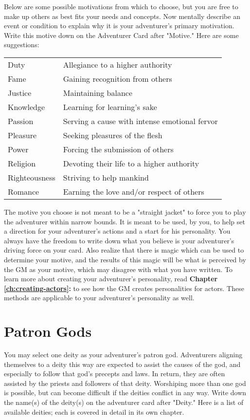 \begin{multicols*}{2}
Below are some possible motivations from which to choose, but you are free to make up others as best fits your needs and concepts. Now mentally describe an event or condition to explain why it is your adventurer's primary motivation. Write this motive down on the Adventurer Card after "Motive." Here are some suggestions:
\begin{normbox}[Motivation]
\begin{tabularx}{\linewidth}{@{} l L}
\small
Duty & Allegiance to a higher authority\\
Fame & Gaining recognition from others\\
Justice & Maintaining balance\\
Knowledge & Learning for learning's sake\\
Passion & Serving a cause with intense emotional fervor\\
Pleasure & Seeking pleasures of the flesh\\
Power & Forcing the submission of others\\
Religion & Devoting their life to a higher authority\\
Righteousness & Striving to help mankind\\
Romance & Earning the love and/or respect of others
\end{tabularx}
\end{normbox}
\normalsize
The motive you choose is not meant to be a "straight jacket" to force you to play the adventurer within narrow bounds. It is meant to be used, by you, to help set a direction for your adventurer's actions and a start for his personality. You always have the freedom to write down what you believe is your adventurer's driving force on your card. Also realize that there is magic which can be used to determine your motive, and the results of this magic will be what is perceived by the GM as your motive, which may disagree with what you have written.
To learn more about creating your adventurer's personality, read \textbf{Chapter \ref{ch:creating-actors}: } to see how the GM creates personalities for actors. These methods are applicable to your adventurer's personality as well.
\section{Patron Gods}
You may select one deity as your adventurer's patron god. Adventurers aligning themselves to a deity this way are expected to assist the causes of the god, and especially to follow that god's precepts and laws. In return, they are often assisted by the priests and followers of that deity. Worshiping more than one god is possible, but can become difficult if the deities conflict in any way. Write down the name(s) of the deity(s) on the adventurer card after "Deity." Here is a list of available deities; each is covered in detail in its own chapter.


\end{multicols*}
